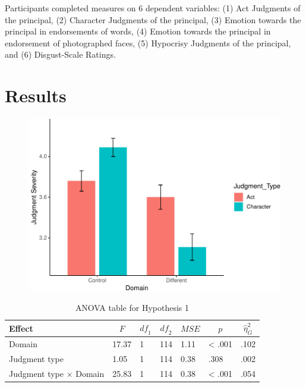 \documentclass[man]{apa6}
\begin{document}
Participants completed measures on 6 dependent variables: (1) Act
Judgments of the principal, (2) Character Judgments of the principal,
(3) Emotion towards the principal in endorsements of words, (4) Emotion
towards the principal in endorsement of photographed faces, (5)
Hypocrisy Judgments of the principal, and (6) Disgust-Scale Ratings.

\section{Results}\label{results}

\begin{figure}
\centering
\includegraphics{APA_Report_files/figure-latex/unnamed-chunk-2-1.pdf}
\caption{}
\end{figure}

\begin{table}[tbp]
\begin{center}
\begin{threeparttable}
\caption{\label{tab:aovtable}ANOVA table for Hypothesis 1}
\begin{tabular}{lllllll}
\toprule
Effect & \multicolumn{1}{c}{$F$} & \multicolumn{1}{c}{$\mathit{df}_1$} & \multicolumn{1}{c}{$\mathit{df}_2$} & \multicolumn{1}{c}{$\mathit{MSE}$} & \multicolumn{1}{c}{$p$} & \multicolumn{1}{c}{$\hat{\eta}^2_G$}\\
\midrule
Domain & 17.37 & 1 & 114 & 1.11 & < .001 & .102\\
Judgment type & 1.05 & 1 & 114 & 0.38 & .308 & .002\\
Judgment type $\times$ Domain & 25.83 & 1 & 114 & 0.38 & < .001 & .054\\
\bottomrule
\end{tabular}
\end{threeparttable}
\end{center}
\end{table}
\end{document}
